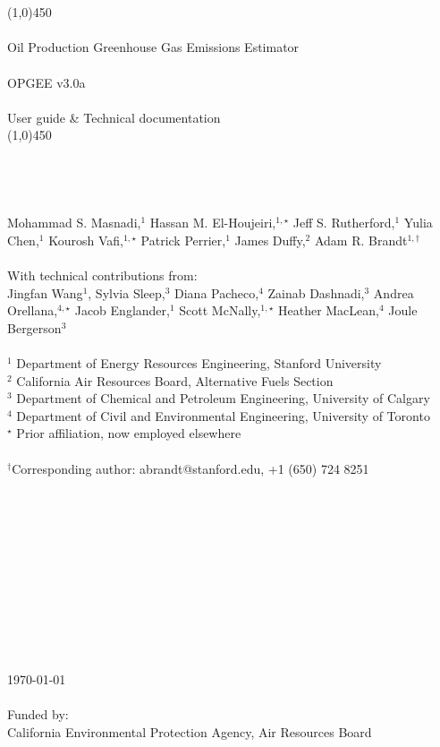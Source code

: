 \documentclass[11pt]{report}
\newcommand{\arbtitle}[1]{\textrm{\Large{#1}}}
\newcommand{\version}{v3.0a}
\begin{document}
\thispagestyle{plain}
\noindent \arbtitle{\\
\\
\linethickness{0.6mm} \line(1,0){450}\\
\\
{{\textcolor{stanford}{Oil Production Greenhouse Gas Emissions Estimator \\
\\
OPGEE \version \;\\ 
\\
\large{User guide \& Technical documentation} }}}}
\\
\linethickness{0.6mm} \line(1,0){450}\\
\\
\\
\noindent 
\textrm{\\
\\
 Mohammad S. Masnadi,$^1$ Hassan M. El-Houjeiri,$^{1,\star}$ Jeff S. Rutherford,$^1$ Yulia Chen,$^1$ Kourosh Vafi,$^{1,\star}$ Patrick Perrier,$^{1}$ James Duffy,$^2$ Adam R. Brandt$^{1,\dagger}$\\
\\
With technical contributions from:\\
Jingfan Wang$^1$, Sylvia Sleep,$^3$  Diana Pacheco,$^4$ Zainab Dashnadi,$^3$ Andrea Orellana,$^{4,\star}$ Jacob Englander,$^1$ Scott McNally,$^{1,\star}$ Heather MacLean,$^4$ Joule Bergerson$^3$\\
\\
$^1$ Department of Energy Resources Engineering, Stanford University \\
$^2$ California Air Resources Board, Alternative Fuels Section\\
$^3$ Department of Chemical and Petroleum Engineering, University of Calgary\\
$^4$ Department of Civil and Environmental Engineering, University of Toronto\\
$^\star$ Prior affiliation, now employed elsewhere
\\
\\
$^{\dagger}$Corresponding author: abrandt@stanford.edu, +1 (650) 724 8251
\\
\\
\\
\\
\\
\\
\\
\\
\\
\\
\\
\\
\today \\
\\
Funded by:\\
California Environmental Protection Agency, Air Resources Board}
\end{document}
